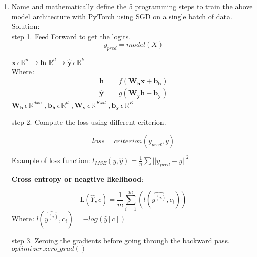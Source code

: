 \documentclass[letterpaper,11pt]{article}
\begin{document}
   \begin{enumerate}

    \item Name and mathematically define the 5 programming steps to train the above 
    model architecture with PyTorch using SGD on a single batch of data.
    \\
    Solution:\\
    step 1. Feed Forward to get the logits.
    \begin{equation}
        y_{pred} = model(X)
    \end{equation}

    \begin{math}
        \mathbf{x} \, \epsilon \, \mathbb{R}^{n} \rightarrow \mathbf{h}
        \epsilon \, \mathbb{R}^{d} \rightarrow \hat{\textbf{y}} \,\epsilon \, \mathbb{R}^{k}
    \end{math}\\
    Where:
    \begin{align}
         \mathbf{h} &= f(\mathbf{W_h}\mathbf{x} + \mathbf{b_h})\\
         \hat{\textbf{y}} &= g(\mathbf{W_y}\mathbf{h} + \mathbf{b_y})
    \end{align}
    $ \mathbf{W_h} \, \epsilon \, \mathbb{R}^{dxn} \,\,, \mathbf{b_h} \, \epsilon \, \mathbb{R}^{d} \,\,,
    \mathbf{W_y} \, \epsilon \, \mathbb{R}^{Kxd} \,\,, \mathbf{b_y} \, \epsilon \, \mathbb{R}^{K}$

    step 2. Compute the loss using different criterion.

    \begin{equation}
        loss = criterion(y_{pred}, y)
    \end{equation}

    Example of loss function: $l_{MSE}(y, \hat{y}) =\frac{1}{n} \sum {||y_{pred} - y||^{2}}$

    \textbf{Cross entropy or neagtive likelihood}:

    \begin{equation}
    \mathrm{L}(\hat{Y}, c) = \frac{1}{m} \sum^{m}_{i = 1}(l(\hat{y^(i)}, c_i))
    \end{equation}
    Where: $l(\hat{y^(i)}, c_i) = -log(\hat{y}[c])$

    step 3. Zeroing the gradients before going through the backward pass.
    $optimizer.zero\_ grad()$


\end{enumerate}
\end{document}
